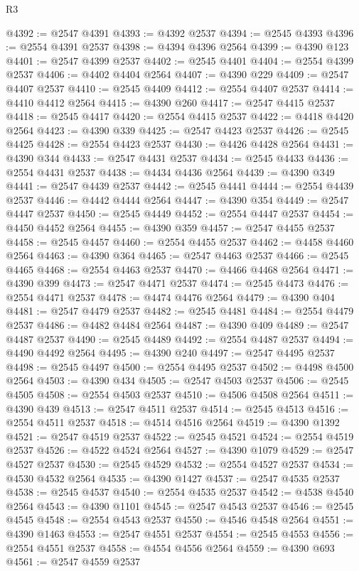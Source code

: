 \begin{lexlean}{R3}
\begin{coremodule}
@4392 := @2547 @4391
@4393 := @4392 @2537
@4394 := @2545 @4393
@4396 := @2554 @4391 @2537
@4398 := @4394 @4396 @2564
@4399 := @4390 @123
@4401 := @2547 @4399 @2537
@4402 := @2545 @4401
@4404 := @2554 @4399 @2537
@4406 := @4402 @4404 @2564
@4407 := @4390 @229
@4409 := @2547 @4407 @2537
@4410 := @2545 @4409
@4412 := @2554 @4407 @2537
@4414 := @4410 @4412 @2564
@4415 := @4390 @260
@4417 := @2547 @4415 @2537
@4418 := @2545 @4417
@4420 := @2554 @4415 @2537
@4422 := @4418 @4420 @2564
@4423 := @4390 @339
@4425 := @2547 @4423 @2537
@4426 := @2545 @4425
@4428 := @2554 @4423 @2537
@4430 := @4426 @4428 @2564
@4431 := @4390 @344
@4433 := @2547 @4431 @2537
@4434 := @2545 @4433
@4436 := @2554 @4431 @2537
@4438 := @4434 @4436 @2564
@4439 := @4390 @349
@4441 := @2547 @4439 @2537
@4442 := @2545 @4441
@4444 := @2554 @4439 @2537
@4446 := @4442 @4444 @2564
@4447 := @4390 @354
@4449 := @2547 @4447 @2537
@4450 := @2545 @4449
@4452 := @2554 @4447 @2537
@4454 := @4450 @4452 @2564
@4455 := @4390 @359
@4457 := @2547 @4455 @2537
@4458 := @2545 @4457
@4460 := @2554 @4455 @2537
@4462 := @4458 @4460 @2564
@4463 := @4390 @364
@4465 := @2547 @4463 @2537
@4466 := @2545 @4465
@4468 := @2554 @4463 @2537
@4470 := @4466 @4468 @2564
@4471 := @4390 @399
@4473 := @2547 @4471 @2537
@4474 := @2545 @4473
@4476 := @2554 @4471 @2537
@4478 := @4474 @4476 @2564
@4479 := @4390 @404
@4481 := @2547 @4479 @2537
@4482 := @2545 @4481
@4484 := @2554 @4479 @2537
@4486 := @4482 @4484 @2564
@4487 := @4390 @409
@4489 := @2547 @4487 @2537
@4490 := @2545 @4489
@4492 := @2554 @4487 @2537
@4494 := @4490 @4492 @2564
@4495 := @4390 @240
@4497 := @2547 @4495 @2537
@4498 := @2545 @4497
@4500 := @2554 @4495 @2537
@4502 := @4498 @4500 @2564
@4503 := @4390 @434
@4505 := @2547 @4503 @2537
@4506 := @2545 @4505
@4508 := @2554 @4503 @2537
@4510 := @4506 @4508 @2564
@4511 := @4390 @439
@4513 := @2547 @4511 @2537
@4514 := @2545 @4513
@4516 := @2554 @4511 @2537
@4518 := @4514 @4516 @2564
@4519 := @4390 @1392
@4521 := @2547 @4519 @2537
@4522 := @2545 @4521
@4524 := @2554 @4519 @2537
@4526 := @4522 @4524 @2564
@4527 := @4390 @1079
@4529 := @2547 @4527 @2537
@4530 := @2545 @4529
@4532 := @2554 @4527 @2537
@4534 := @4530 @4532 @2564
@4535 := @4390 @1427
@4537 := @2547 @4535 @2537
@4538 := @2545 @4537
@4540 := @2554 @4535 @2537
@4542 := @4538 @4540 @2564
@4543 := @4390 @1101
@4545 := @2547 @4543 @2537
@4546 := @2545 @4545
@4548 := @2554 @4543 @2537
@4550 := @4546 @4548 @2564
@4551 := @4390 @1463
@4553 := @2547 @4551 @2537
@4554 := @2545 @4553
@4556 := @2554 @4551 @2537
@4558 := @4554 @4556 @2564
@4559 := @4390 @693
@4561 := @2547 @4559 @2537

\end{coremodule}
\end{lexlean}
